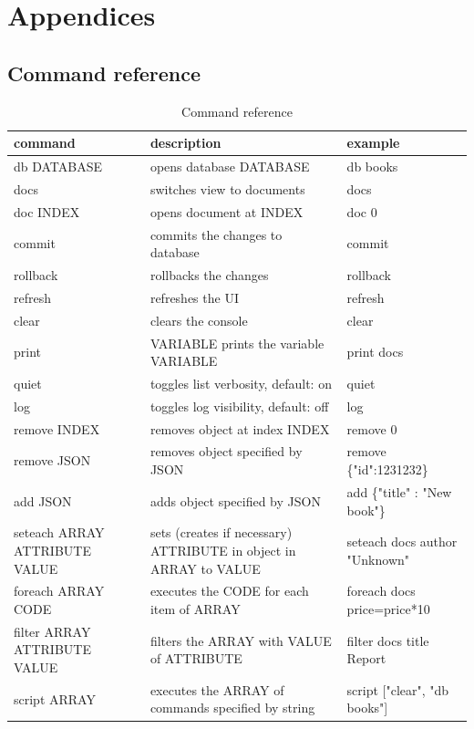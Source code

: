 \documentclass[10pt,a4paper,oneside]{report}
\begin{document}
\chapter{Appendices}
\section{Command reference}

\begin{table}
\centering
\begin{tabularx}{\textwidth}{ | l | X | l | }
\hline
\textbf{command} & \textbf{description} & \textbf{example} \\ \hline 
db DATABASE	& opens database DATABASE & db books \\ \hline
docs & switches view to documents & docs \\ \hline
doc INDEX & opens document at INDEX & doc 0 \\ \hline
commit & commits the changes to database & commit \\ \hline
rollback & rollbacks the changes & rollback \\ \hline
refresh & refreshes the UI & refresh \\ \hline
clear & clears the console & clear \\ \hline
print & VARIABLE	prints the variable VARIABLE & print docs \\ \hline
quiet & toggles list verbosity, default: on & quiet \\ \hline
log & toggles log visibility, default: off & log \\ \hline
remove INDEX & removes object at index INDEX & remove 0 \\ \hline
remove JSON & removes object specified by JSON & remove  \{"id":1231232\} \\ \hline
add JSON & adds object specified by JSON & add \{"title" : "New book"\} \\ \hline
seteach ARRAY ATTRIBUTE VALUE & sets (creates if necessary) ATTRIBUTE in object in ARRAY to VALUE & seteach docs author "Unknown" \\ \hline
foreach ARRAY CODE & executes the CODE for each item of ARRAY & foreach docs price=price*10 \\ \hline
filter ARRAY ATTRIBUTE VALUE & filters the ARRAY with VALUE of ATTRIBUTE & filter docs  title Report \\ \hline
script ARRAY & executes the ARRAY of commands specified by string & script ["clear", "db books"] \\ \hline
\end{tabularx}
\caption{Command reference}
\label{table:command-reference}
\end{table}




%
\end{document}
